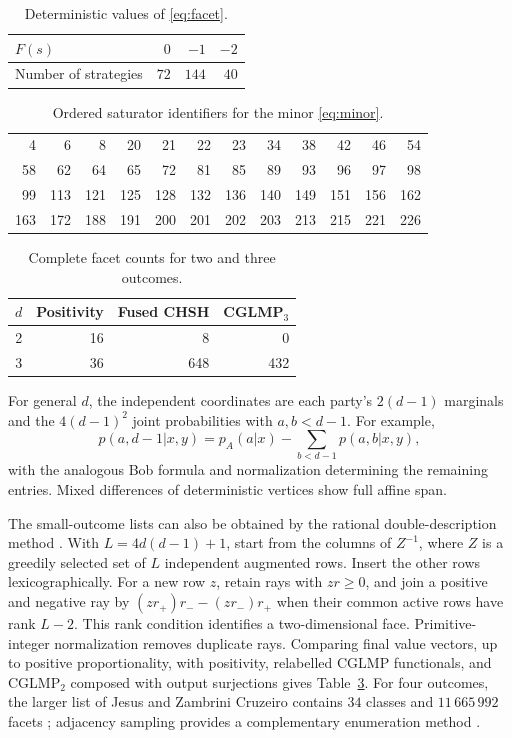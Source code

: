 \documentclass[11pt]{amsart}
\theoremstyle{remark}
\theoremstyle{plain}
\numberwithin{equation}{section}
\begin{document}
\begin{table}[ht]
\centering
\caption{Deterministic values of \eqref{eq:facet}.}
\label{tab:facetdata}
\begin{tabular}{@{}lrrr@{}}
\toprule
\(F(s)\) & \(0\) & \(-1\) & \(-2\)\\
\midrule
Number of strategies & \(72\) & \(144\) & \(40\)\\
\bottomrule
\end{tabular}
\end{table}

\begin{table}[ht]
\centering
\small
\caption{Ordered saturator identifiers for the minor
\eqref{eq:minor}.}
\label{tab:minor}
\begin{tabular}{@{}rrrrrrrrrrrr@{}}
\toprule
4&6&8&20&21&22&23&34&38&42&46&54\\
58&62&64&65&72&81&85&89&93&96&97&98\\
99&113&121&125&128&132&136&140&149&151&156&162\\
163&172&188&191&200&201&202&203&213&215&221&226\\
\bottomrule
\end{tabular}
\end{table}

\begin{table}[ht]
\centering
\caption{Complete facet counts for two and three outcomes.}
\label{tab:smallfacets}
\begin{tabular}{@{}crrr@{}}
\toprule
\(d\) & Positivity & Fused CHSH & CGLMP\(_3\)\\
\midrule
2 & 16 & 8 & 0\\
3 & 36 & 648 & 432\\
\bottomrule
\end{tabular}
\end{table}

For general \(d\), the independent coordinates are each party's
\(2(d-1)\) marginals and the \(4(d-1)^2\) joint probabilities with
\(a,b<d-1\). For example,
\[
 p(a,d-1|x,y)=p_A(a|x)-\sum_{b<d-1}p(a,b|x,y),
\]
with the analogous Bob formula and normalization determining the
remaining entries. Mixed differences of deterministic vertices show
full affine span.

The small-outcome lists can also be obtained by the rational
double-description method \cite{FukudaProdon}.
With \(L=4d(d-1)+1\), start from the columns of \(Z^{-1}\), where
\(Z\) is a greedily selected set of \(L\) independent augmented rows.
Insert the other rows lexicographically. For a new row \(z\),
retain rays with \(zr\ge0\), and join a positive and negative ray by
\((zr_+)r_--(zr_-)r_+\) when their common active rows have rank
\(L-2\). This rank condition identifies a two-dimensional face.
Primitive-integer normalization removes duplicate rays.
Comparing final value vectors, up to positive proportionality,
with positivity, relabelled CGLMP functionals, and CGLMP\(_2\)
composed with output surjections gives Table~\ref{tab:smallfacets}.
For four outcomes, the larger list of Jesus and
Zambrini Cruzeiro contains \(34\) classes and \(11\,665\,992\)
facets \cite{JC}; adjacency sampling provides a complementary
enumeration method \cite{Staufenbiel}.
\end{document}
